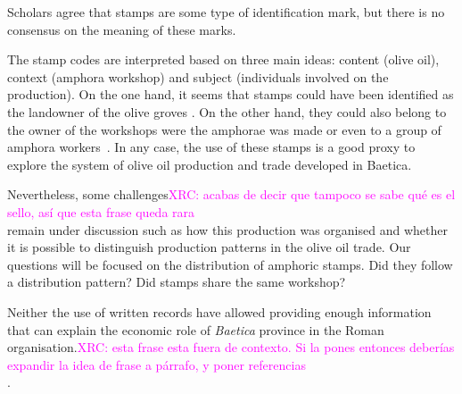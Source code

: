 \documentclass[review]{elsarticle}
\newcommand{\memo}[2]{\textcolor{#1}{#2}}
\newcommand{\xavi}[1]{\memo{magenta}{XRC: #1\\}}
\begin{document}
Scholars agree that stamps are some type of identification mark, but there is no consensus on the meaning of these marks\citep{rodriguez_baetican_1998}. 


The stamp codes are interpreted based on three main ideas: content (olive oil), context (amphora workshop) and subject (individuals involved on the production). On the one hand, it seems that stamps could have been identified as the landowner of the olive groves \citep{rodriguez_economioleicola_1977}. On the other hand, they could also belong to the owner of the workshops were the amphorae was made or even to a group of amphora workers~\citep{berni_millet_epigrafianforica_2008}. In any case, the use of these stamps is a good proxy to explore the system of olive oil production and trade developed in Baetica.

Nevertheless, some challenges\xavi{acabas de decir que tampoco se sabe qué es el sello, así que esta frase queda rara} remain under discussion such as how this production was organised and whether it is possible to distinguish production patterns in the olive oil trade. Our questions will be focused on the distribution of amphoric stamps. Did they follow a distribution pattern? Did stamps share the same workshop? 

Neither the use of written records have allowed providing enough information that can explain the economic role of \textit{Baetica} province in the Roman organisation.\xavi{esta frase esta fuera de contexto. Si la pones entonces deberías expandir la idea de frase a párrafo, y poner referencias}.
  


\end{document}
